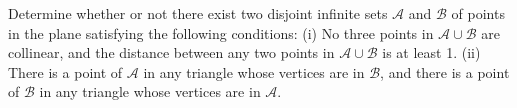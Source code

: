 Determine whether or not there exist two disjoint infinite sets $\mathcal{A}$ and $\mathcal{B}$ of points in the plane satisfying the following conditions:
(i) No three points in $\mathcal{A} \cup \mathcal{B}$ are collinear, and the distance between any two points in $\mathcal{A} \cup \mathcal{B}$ is at least 1.
(ii) There is a point of $\mathcal{A}$ in any triangle whose vertices are in $\mathcal{B}$, and there is a point of $\mathcal{B}$ in any triangle whose vertices are in $\mathcal{A}$.
